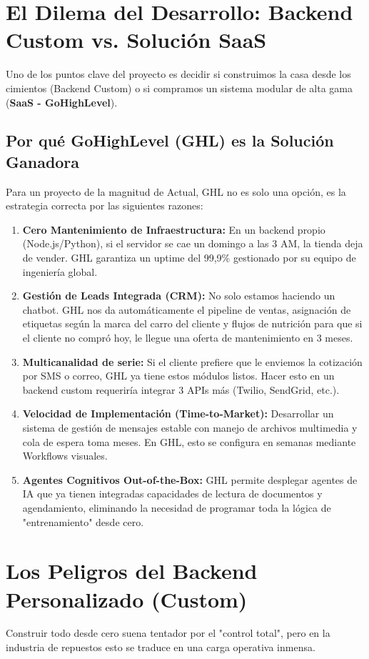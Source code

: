 \documentclass[12pt,a4paper]{article}
\begin{document}
\section{El Dilema del Desarrollo: Backend Custom vs. Solución SaaS}
Uno de los puntos clave del proyecto es decidir si construimos la casa desde los cimientos (Backend Custom) o si compramos un sistema modular de alta gama (\textbf{SaaS - GoHighLevel}).

\subsection{Por qué GoHighLevel (GHL) es la Solución Ganadora}
Para un proyecto de la magnitud de Actual, GHL no es solo una opción, es la estrategia correcta por las siguientes razones:
\begin{enumerate}
    \item \textbf{Cero Mantenimiento de Infraestructura:} En un backend propio (Node.js/Python), si el servidor se cae un domingo a las 3 AM, la tienda deja de vender. GHL garantiza un uptime del 99,9\% gestionado por su equipo de ingeniería global.
    \item \textbf{Gestión de Leads Integrada (CRM):} No solo estamos haciendo un chatbot. GHL nos da automáticamente el pipeline de ventas, asignación de etiquetas según la marca del carro del cliente y flujos de nutrición para que si el cliente no compró hoy, le llegue una oferta de mantenimiento en 3 meses.
    \item \textbf{Multicanalidad de serie:} Si el cliente prefiere que le enviemos la cotización por SMS o correo, GHL ya tiene estos módulos listos. Hacer esto en un backend custom requeriría integrar 3 APIs más (Twilio, SendGrid, etc.).
    \item \textbf{Velocidad de Implementación (Time-to-Market):} Desarrollar un sistema de gesti\'on de mensajes estable con manejo de archivos multimedia y cola de espera toma meses. En GHL, esto se configura en semanas mediante Workflows visuales.
    \item \textbf{Agentes Cognitivos Out-of-the-Box:} GHL permite desplegar agentes de IA que ya tienen integradas capacidades de lectura de documentos y agendamiento, eliminando la necesidad de programar toda la lógica de "entrenamiento" desde cero.
\end{enumerate}

\newpage

\section{Los Peligros del Backend Personalizado (Custom) }
Construir todo desde cero suena tentador por el "control total", pero en la industria de repuestos esto se traduce en una carga operativa inmensa.
\end{document}
